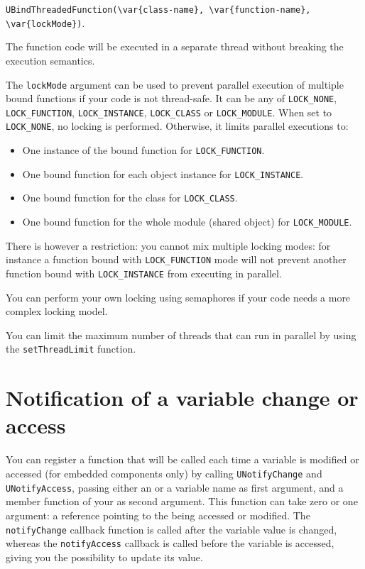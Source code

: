 \lstinline|UBindThreadedFunction(\var{class-name}, \var{function-name}, \var{lockMode})|.

The function code will be executed in a separate thread without breaking the
\us execution semantics.

The \lstinline{lockMode} argument can be used to prevent parallel execution
of multiple bound functions if your code is not thread-safe. It can be any of
\lstinline{LOCK_NONE}, \lstinline{LOCK_FUNCTION}, \lstinline{LOCK_INSTANCE},
\lstinline{LOCK_CLASS} or \lstinline{LOCK_MODULE}.
When set to \lstinline{LOCK_NONE}, no locking is performed. Otherwise, it
limits parallel executions to:

\begin{itemize}
\item One instance of the bound function for \lstinline{LOCK_FUNCTION}.
\item One bound function for each object instance for
\lstinline{LOCK_INSTANCE}.
\item One bound function for the class for \lstinline{LOCK_CLASS}.
\item One bound function for the whole module (shared object) for
\lstinline{LOCK_MODULE}.
\end{itemize}

There is however a restriction: you cannot mix multiple locking modes: for
instance a function bound with \lstinline{LOCK_FUNCTION} mode will not prevent
another function bound with \lstinline{LOCK_INSTANCE} from executing in
parallel.

You can perform your own locking using semaphores if your code needs a more
complex locking model.

You can limit the maximum number of threads that can run in parallel by using
the \lstinline{setThreadLimit} function.

\section{Notification of a variable change or access}

You can register a function that will be called each time a variable
is modified or accessed (for embedded components only) by calling
\lstinline{UNotifyChange} and \lstinline{UNotifyAccess}, passing
either an \UVar or a variable name as first argument, and a member
function of your \UObject as second argument. This function can take
zero or one argument: a \UVar reference pointing to the \UVar being
accessed or modified. The \lstinline{notifyChange} callback function
is called after the variable value is changed, whereas the
\lstinline{notifyAccess} callback is called before the variable is
accessed, giving you the possibility to update its value.

